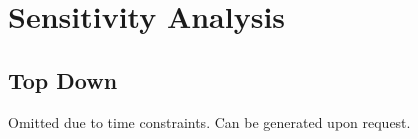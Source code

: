 \section{Sensitivity Analysis}\label{sec:sensitivity_analysis}
\subsection{Top Down}\label{subsec:sensitivity_analysis_top_down}
Omitted due to time constraints. Can be generated upon request.